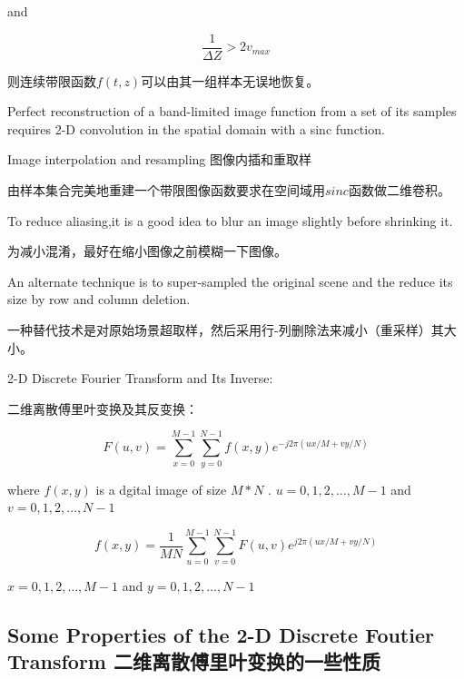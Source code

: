 \documentclass[12pt]{article}
\numberwithin{equation}{section}%
\begin{document}
and 

\begin{equation} \label{4.25}
\frac{1}{\Delta Z}>2v_{max}
\end{equation}

则连续带限函数$f(t,z)$可以由其一组样本无误地恢复。

Perfect reconstruction of a band-limited image function from a set of its samples requires 2-D convolution in the spatial domain with a sinc function.

\begin{description}

\item [Image interpolation and resampling 图像内插和重取样]

\end{description}

由样本集合完美地重建一个带限图像函数要求在空间域用$sinc$函数做二维卷积。

To reduce aliasing,it is a good idea to blur an image slightly before shrinking it.

为减小混淆，最好在缩小图像之前模糊一下图像。

{\color{red}{那放大图像会不会产生模糊？需不需要在放大之前缩小取样频率？}}

An alternate technique is to super-sampled the original scene and the reduce its size by row and column deletion.

一种替代技术是对原始场景超取样，然后采用行-列删除法来减小（重采样）其大小。

2-D Discrete Fourier Transform and Its Inverse:

二维离散傅里叶变换及其反变换：

\begin{equation} \label{4.26}
F(u,v)=\sum_{x=0}^{M-1}\sum_{y=0}^{N-1}f(x,y)e^{-j2\pi(ux/M+vy/N)}
\end{equation}

where $f(x,y)$ is a dgital image of size $M*N$ . $u=0,1,2,\ldots,M-1$ and $v=0,1,2,\ldots,N-1$

\begin{equation} \label{4.27}
f(x,y)=\frac{1}{MN}\sum_{u=0}^{M-1}\sum_{v=0}^{N-1}F(u,v)e^{j2\pi(ux/M+vy/N)}
\end{equation}

$x=0,1,2,\ldots,M-1$ and $y=0,1,2,\ldots,N-1$
	   
\subsection{Some Properties of the 2-D Discrete Foutier Transform 二维离散傅里叶变换的一些性质}
\end{document}
